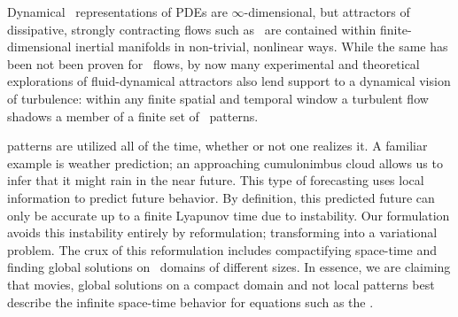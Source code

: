 



Dynamical \statesp\ representations of PDEs are $\infty$-dimensional, but
attractors of dissipative, strongly contracting flows such as \KS\ are
contained within finite-dimensional inertial manifolds%
 in non-trivial, nonlinear ways. While the same has been
not been proven for \NS\ flows, by now many
experimental and theoretical explorations of fluid-dynamical attractors
also lend support to a dynamical vision of turbulence: within any finite spatial
and temporal window a turbulent flow shadows a member of a finite set
of \spt\ patterns.


{\Spt} patterns are utilized all of the time, whether or not one realizes it.
 A familiar example is weather prediction; an approaching
cumulonimbus cloud allows us to infer that it might rain in the near future. This
type of forecasting uses local information to predict future behavior. By
definition, this predicted future can only be accurate up to a finite Lyapunov time
due to instability. Our {\spt} formulation avoids this instability entirely
by reformulation; transforming into a variational problem. The crux of this reformulation
includes compactifying space-time and finding global solutions on \spt\ domains of different sizes.
In essence, we are claiming that {\spt} movies, global solutions on a compact domain and not local patterns
best describe the infinite space-time behavior for equations such as the \KSe.

